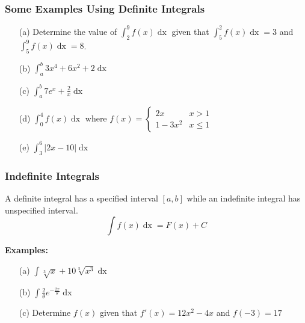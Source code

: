 \documentclass{beamer}
\begin{document}
\begin{frame}
\frametitle{\textbf{Some Examples Using Definite Integrals}}

\begin{itemize}
	\item[(a)] Determine the value of $\int_{2}^{9}f(x) \mathop{dx}$ given that  $\int_{5}^{2}f(x) \mathop{dx} = 3$ and  $\int_{5}^{9}f(x) \mathop{dx} = 8$.
	\item[(b)] $\int_{a}^{b}3x^4 + 6x^2 + 2 \mathop{dx}$
	\item[(c)] $\int_{a}^{b} 7e^x + \frac{2}{x} \mathop{dx}$
	\item[(d)] $\int_{0}^{4} f(x) \mathop{dx}$ where $f(x) = \begin{cases}
	2x & x>1\\ 1-3x^2 & x \leq 1
	\end{cases}$
	\item[(e)] $\int_3^6 |2x-10| \mathop{dx}$
\end{itemize}
\end{frame}

\begin{frame}
\frametitle{\textbf{Indefinite Integrals}}
A definite integral has a specified interval $[a,b]$ while an indefinite integral has unspecified interval.
$$\int f(x) \mathop{dx} = F(x) + C$$

\vspace{6pt}
\textbf{Examples:}
\begin{itemize}
	\item[(a)] $\int \sqrt[3]{x} + 10 \sqrt[5]{x^3} \mathop{dx}$
	\item[(b)] $\int \frac{2}{\theta}e^{-\frac{2x}{\theta}} \mathop{dx}$
	\item[(c)] Determine $f(x)$ given that $f'(x) = 12x^2-4x$ and $f(-3)=17$
\end{itemize}
\end{frame}
\end{document}
